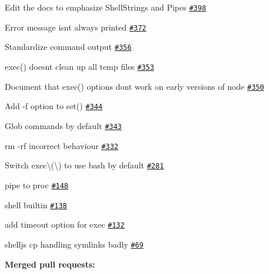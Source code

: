 \begin{DoxyItemize}
\item Edit the docs to emphasize Shell\+Strings and Pipes \href{https://github.com/shelljs/shelljs/issues/398}{\tt \#398}
\item Error message isn\textquotesingle{}t always printed \href{https://github.com/shelljs/shelljs/issues/372}{\tt \#372}
\item Standardize command output \href{https://github.com/shelljs/shelljs/issues/356}{\tt \#356}
\item exec() doesn\textquotesingle{}t clean up all temp files \href{https://github.com/shelljs/shelljs/issues/353}{\tt \#353}
\item Document that exec() options don\textquotesingle{}t work on early versions of node \href{https://github.com/shelljs/shelljs/issues/350}{\tt \#350}
\item Add -\/f option to set() \href{https://github.com/shelljs/shelljs/issues/344}{\tt \#344}
\item Glob commands by default \href{https://github.com/shelljs/shelljs/issues/343}{\tt \#343}
\item rm -\/rf incorrect behaviour \href{https://github.com/shelljs/shelljs/issues/332}{\tt \#332}
\item Switch {\ttfamily exec\textbackslash{}(\textbackslash{})} to use bash by default \href{https://github.com/shelljs/shelljs/issues/281}{\tt \#281}
\item pipe to proc \href{https://github.com/shelljs/shelljs/issues/148}{\tt \#148}
\item shell builtin \href{https://github.com/shelljs/shelljs/issues/138}{\tt \#138}
\item add timeout option for exec \href{https://github.com/shelljs/shelljs/issues/132}{\tt \#132}
\item shelljs cp handling symlinks badly \href{https://github.com/shelljs/shelljs/issues/69}{\tt \#69}
\end{DoxyItemize}

{\bfseries Merged pull requests\+:}


